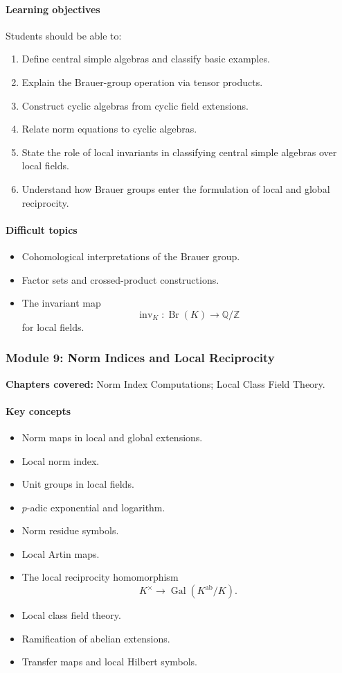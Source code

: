 \documentclass[11pt]{article}
\newcommand{\Q}{\mathbb{Q}}
\newcommand{\Z}{\mathbb{Z}}
\newcommand{\Gal}{\operatorname{Gal}}
\begin{document}
\paragraph{Learning objectives}
Students should be able to:
\begin{enumerate}
    \item Define central simple algebras and classify basic examples.
    \item Explain the Brauer-group operation via tensor products.
    \item Construct cyclic algebras from cyclic field extensions.
    \item Relate norm equations to cyclic algebras.
    \item State the role of local invariants in classifying central simple algebras over local fields.
    \item Understand how Brauer groups enter the formulation of local and global reciprocity.
\end{enumerate}

\paragraph{Difficult topics}
\begin{itemize}
    \item Cohomological interpretations of the Brauer group.
    \item Factor sets and crossed-product constructions.
    \item The invariant map
    \[
    \operatorname{inv}_K:\operatorname{Br}(K)\longrightarrow \Q/\Z
    \]
    for local fields.
\end{itemize}

\subsubsection*{Module 9: Norm Indices and Local Reciprocity}

\textbf{Chapters covered:} Norm Index Computations; Local Class Field Theory.

\paragraph{Key concepts}
\begin{itemize}
    \item Norm maps in local and global extensions.
    \item Local norm index.
    \item Unit groups in local fields.
    \item $p$-adic exponential and logarithm.
    \item Norm residue symbols.
    \item Local Artin maps.
    \item The local reciprocity homomorphism
    \[
    K^\times \longrightarrow \Gal(K^{\mathrm{ab}}/K).
    \]
    \item Local class field theory.
    \item Ramification of abelian extensions.
    \item Transfer maps and local Hilbert symbols.
\end{itemize}
\end{document}
